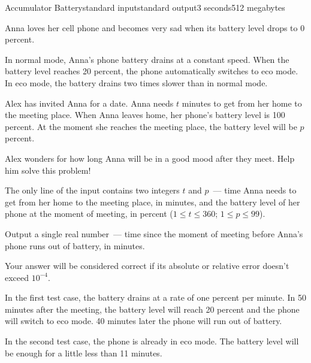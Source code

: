 \begin{problem}{Accumulator Battery}{standard input}{standard output}{3 seconds}{512 megabytes}

Anna loves her cell phone and becomes very sad when its battery level drops to 0 percent.

In normal mode, Anna's phone battery drains at a constant speed. When the battery level reaches 20 percent, the phone automatically switches to eco mode. In eco mode, the battery drains two times slower than in normal mode.

Alex has invited Anna for a date. Anna needs $t$ minutes to get from her home to the meeting place. When Anna leaves home, her phone's battery level is 100 percent. At the moment she reaches the meeting place, the battery level will be $p$ percent.

Alex wonders for how long Anna will be in a good mood after they meet. Help him solve this problem!


\InputFile
The only line of the input contains two integers $t$ and $p$~--- time Anna needs to get from her home to the meeting place, in minutes, and the battery level of her phone at the moment of meeting, in percent ($1 \le t \le 360$; $1 \le p \le 99$).

\OutputFile
Output a single real number~--- time since the moment of meeting before Anna's phone runs out of battery, in minutes.

Your answer will be considered correct if its absolute or relative error doesn't exceed $10^{-4}$.

\Examples

\begin{example}
%
%
\end{example}

\Note
In the first test case, the battery drains at a rate of one percent per minute. In 50 minutes after the meeting, the battery level will reach 20 percent and the phone will switch to eco mode. 40 minutes later the phone will run out of battery.

In the second test case, the phone is already in eco mode. The battery level will be enough for a little less than 11 minutes.

\end{problem}

